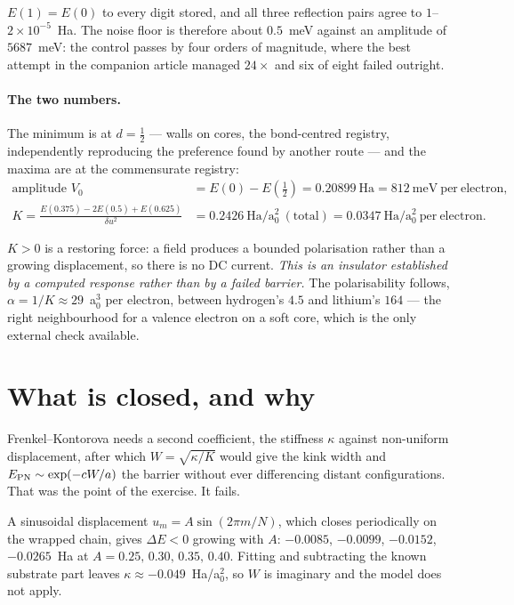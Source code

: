\documentclass[11pt]{article}
\newcommand{\half}{\tfrac12}
\begin{document}
\noindent $E(1)=E(0)$ to every digit stored, and all three reflection pairs agree to
$1$--$2\times10^{-5}$~Ha. The noise floor is therefore about $0.5$~meV against an amplitude of
$5687$~meV: the control passes by four orders of magnitude, where the best attempt in the companion
article managed $24\times$ and six of eight failed outright.

\paragraph{The two numbers.} The minimum is at $d=\half$ --- walls on cores, the bond-centred
registry, independently reproducing the preference found by another route --- and the maxima are at
the commensurate registry:
\begin{align*}
\text{amplitude } V_0 &= E(0)-E(\half) = 0.20899~\mathrm{Ha} = 812~\mathrm{meV\ per\ electron},\\
K = \frac{E(0.375)-2E(0.5)+E(0.625)}{\delta u^2}
  &= 0.2426~\mathrm{Ha/a_0^2\ (total)} = 0.0347~\mathrm{Ha/a_0^2\ per\ electron}.
\end{align*}

\noindent $K>0$ is a restoring force: a field produces a bounded polarisation rather than a growing
displacement, so there is no DC current. \emph{This is an insulator established by a computed
response rather than by a failed barrier.} The polarisability follows, $\alpha=1/K\approx29$~a$_0^3$
per electron, between hydrogen's $4.5$ and lithium's $164$ --- the right neighbourhood for a valence
electron on a soft core, which is the only external check available.

\section*{What is closed, and why}

Frenkel--Kontorova needs a second coefficient, the stiffness $\kappa$ against non-uniform
displacement, after which $W=\sqrt{\kappa/K}$ would give the kink width and $E_{\rm
PN}\sim\exp(-cW/a)$ the barrier without ever differencing distant configurations. That was the point
of the exercise. It fails.

A sinusoidal displacement $u_m=A\sin(2\pi m/N)$, which closes periodically on the wrapped chain,
gives $\Delta E<0$ growing with $A$: $-0.0085$, $-0.0099$, $-0.0152$, $-0.0265$~Ha at
$A=0.25,\,0.30,\,0.35,\,0.40$. Fitting and subtracting the known substrate part leaves
$\kappa\approx-0.049$~Ha/a$_0^2$, so $W$ is imaginary and the model does not apply.
\end{document}
